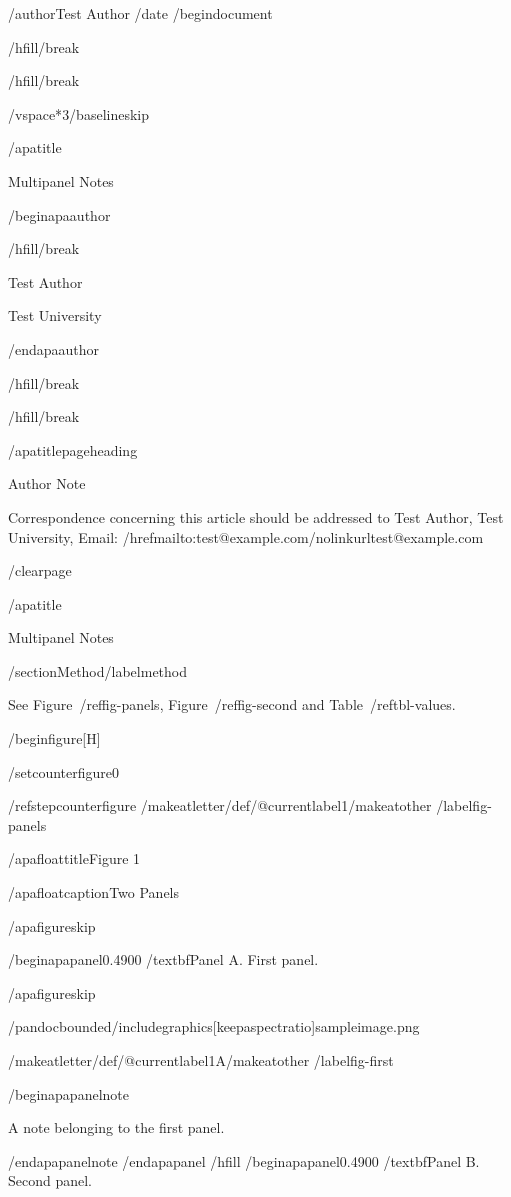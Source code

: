 /author{Test Author}
/date{}
/begin{document}


/hfill/break

/hfill/break

/vspace*{3/baselineskip}

/apatitle{

Multipanel Notes

}

/begin{apaauthor}

/hfill/break

Test Author

Test University

/end{apaauthor}

/hfill/break

/hfill/break

/apatitlepageheading{

Author Note

}

Correspondence concerning this article should be addressed to Test
Author, Test University, Email:
/href{mailto:test@example.com}{/nolinkurl{test@example.com}}

/clearpage

/apatitle{

Multipanel Notes

}

/section{Method}/label{method}

See Figure~/ref{fig-panels}, Figure~/ref{fig-second} and
Table~/ref{tbl-values}.

/begin{figure}[H]

/setcounter{figure}{0}

/refstepcounter{figure}%
/makeatletter/def/@currentlabel{1}/makeatother%
/label{fig-panels}

/apafloattitle{Figure 1}

/apafloatcaption{Two Panels}

/apafigureskip

/begin{apapanel}{0.4900}%
/textbf{Panel A}. First panel.

/apafigureskip

/pandocbounded{/includegraphics[keepaspectratio]{sampleimage.png}}

/makeatletter/def/@currentlabel{1A}/makeatother%
/label{fig-first}

/begin{apapanelnote}

A note belonging to the first panel.

/end{apapanelnote}
/end{apapanel}%
/hfill
/begin{apapanel}{0.4900}%
/textbf{Panel B}. Second panel.

